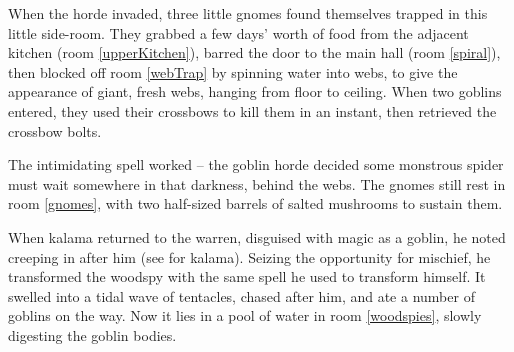\glsresetall

\begin{exampletext}
  \noindent
  When the horde invaded, three little gnomes found themselves trapped in this little side-room.
  They grabbed a few days' worth of food from the adjacent kitchen (room \ref{upperKitchen}),
  barred the door to the main hall (room \vref{spiral}), then blocked off room \vref{webTrap} by spinning water into webs, to give the appearance of giant, fresh webs, hanging from floor to ceiling.
  When two goblins entered, they used their crossbows to kill them in an instant, then retrieved the crossbow bolts.

  The intimidating spell worked -- the goblin horde decided some monstrous spider must wait somewhere in that darkness, behind the webs.
  The gnomes still rest in room \vref{gnomes}, with two half-sized barrels of salted mushrooms to sustain them.

  When \gls{kalama}
  returned to the \gls{warren}, disguised with magic as a goblin, he noted  creeping in after him
  (see  for \gls{kalama}).
  Seizing the opportunity for mischief, he transformed the \gls{woodspy} with the same spell he used to transform himself.
  It swelled into a tidal wave of tentacles, chased after him, and ate a number of goblins on the way.
  Now it lies in a pool of water in room \vref{woodspies}, slowly digesting the goblin bodies.
\end{exampletext}

